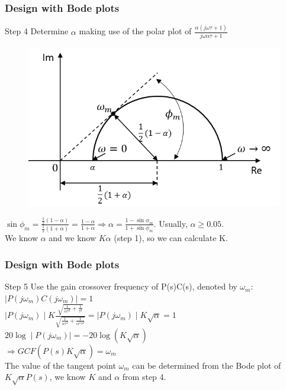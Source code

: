 \begin{frame}	
	\frametitle{Design with Bode plots}
	\begin{block}{Step 4}
		Determine $\alpha$ making use of the polar plot of 
		$\frac{\alpha(j\omega\tau + 1)}{j\omega\alpha\tau + 1}$	
		\begin{figure}
			\centering
			\includegraphics[width=0.4
			\linewidth]{leadcompalphabepalen}
		\end{figure}
		$\sin\phi_m = \frac{\frac{1}{2}\left( 1 - \alpha \right)}{\frac{1}{2}\left( 1 + \alpha \right)} = \frac{1 - \alpha}{1 + \alpha} \Rightarrow \alpha = \frac{1 - \sin\phi_m}{1 + \sin\phi_m}$. Usually, $\alpha \geqslant 0.05$. \\
		We know $\alpha$ and we know $K\alpha$ (step 1), so we can calculate K.
	\end{block}
\end{frame}

\begin{frame}
	\frametitle{Design with Bode plots}
	\begin{block}{Step 5}
		Use the gain crossover frequency of P(s)C(s), denoted by $\omega_m$: \\
		\vspace{0.2 cm}
		$\mid P(j\omega_m)C(j\omega_m) \mid = 1$ \\
		\vspace{0.2 cm}
		$\mid P(j\omega_m) \mid K \frac{\sqrt{\frac{1}{\alpha\tau^2} + \frac{1}{\tau^2}}}{\sqrt{\frac{1}{\alpha\tau^2} + \frac{1}{\alpha^2\tau^2}}} = \mid P(j\omega_m) \mid K \sqrt{\alpha} = 1$ \\
		\vspace{0.2 cm}
		$20\log \mid P \left( j\omega_m \right) \mid = -20\log \left( K\sqrt{\alpha} \right)$ \\
		\vspace{0.2 cm}
		$\Rightarrow GCF \left( P(s)K\sqrt{\alpha} \right) = \omega_m$ \\
		\vspace{0.2 cm}
		The value of the tangent point $\omega_m$ can be determined from the Bode plot of $K\sqrt{\alpha}P(s)$, we know $K$ and $\alpha$ from step 4.
	\end{block}
\end{frame}

